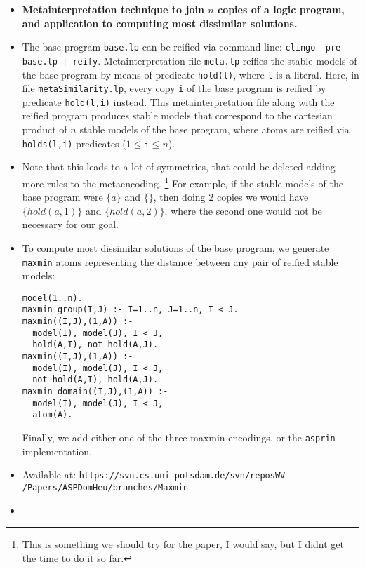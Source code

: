 \documentclass[a4paper,10pt]{article}
\begin{document}
\begin{itemize}
\item
\textbf{Metainterpretation technique to join $n$ copies of a logic program, 
and application to computing most dissimilar solutions.}
\item
The base program \texttt{base.lp} 
can be reified via command line: 
\texttt{clingo --pre base.lp | reify}.
Metainterpretation file \texttt{meta.lp} reifies the stable models of the base program by means of predicate \texttt{hold(l)}, where \texttt{l} is a literal.
Here, in file \texttt{metaSimilarity.lp}, every copy \texttt{i} of the base program is reified by predicate \texttt{hold(l,i)} instead.
This metainterpretation file along with the reified program produces 
stable models that correspond to the cartesian product of $n$ stable models of the base program, 
where atoms are reified via \texttt{holds(l,i)} predicates ($1\leq \texttt{i} \leq n$).
\item
Note that this leads to a lot of symmetries, that could be deleted adding more rules to the metaencoding. 
\footnote{This is something we should try for the paper, I would say, but I didnt get the time to do it so far.}
For example, if the stable models of the base program were $\{a\}$ and $\{\}$, 
then doing $2$ copies we would have $\{hold(a,1)\}$ and $\{hold(a,2)\}$, 
where the second one would not be necessary for our goal.
\item
To compute most dissimilar solutions of the base program, 
we generate \texttt{maxmin} atoms representing the distance between any pair of reified stable models: 
\begin{verbatim}
model(1..n). 
maxmin_group(I,J) :- I=1..n, J=1..n, I < J.
maxmin((I,J),(1,A)) :- 
  model(I), model(J), I < J, 
  hold(A,I), not hold(A,J).
maxmin((I,J),(1,A)) :- 
  model(I), model(J), I < J, 
  not hold(A,I), hold(A,J).
maxmin_domain((I,J),(1,A)) :- 
  model(I), model(J), I < J, 
  atom(A).
\end{verbatim}
Finally, we add either one of the three maxmin encodings, or the \texttt{asprin} implementation.
\item
Available at: \texttt{https://svn.cs.uni-potsdam.de/svn/reposWV
/Papers/ASPDomHeu/branches/Maxmin}
\item


\end{itemize}
\end{document}
